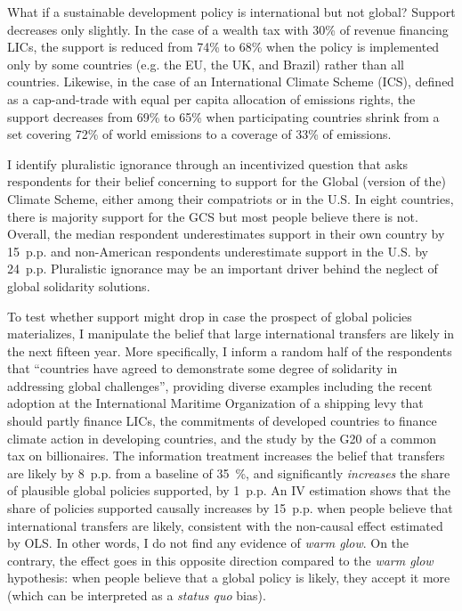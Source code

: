 \documentclass[12pt,english]{article}
\begin{document}
\begin{bibunit}
What if a sustainable development policy is international but not global? Support decreases only slightly. In the case of a wealth tax with 30\% of revenue financing LICs, the support is reduced from 74\% to 68\% when the policy is implemented only by some countries (e.g. the EU, the UK, and Brazil) rather than all countries. Likewise, in the case of an International Climate Scheme (ICS), defined as a cap-and-trade with equal per capita allocation of emissions rights, 
the support decreases from 69\% to 65\% when participating countries shrink from a set covering 72\% of world emissions to a coverage of 33\% of emissions.

I identify pluralistic ignorance through an incentivized question that asks respondents for their belief concerning to support for the Global (version of the) Climate Scheme, either among their compatriots or in the U.S. In eight countries, there is majority support for the GCS but most people believe there is not. Overall, the median respondent underestimates support in their own country by 15~p.p. and non-American respondents underestimate support in the U.S. by 24~p.p. Pluralistic ignorance may be an important driver behind the neglect of global solidarity solutions.

To test whether support might drop in case the prospect of global policies materializes, I manipulate the belief that large international transfers are likely in the next fifteen year. More specifically, I inform a random half of the respondents that ``countries have agreed to demonstrate some
degree of solidarity in addressing global challenges'', providing diverse examples including the recent adoption at the International Maritime Organization of a shipping levy that should partly finance LICs, the commitments of developed countries to finance climate action in developing countries, and the study %
by the G20 of a common tax on billionaires. The information treatment increases the belief that transfers are likely by 8~p.p. from a baseline of 35~\%, and significantly \textit{increases} the share of plausible global policies supported, by 1~p.p. An IV estimation shows that the share of policies supported causally increases by 15~p.p. when people believe that international transfers are likely, consistent with the non-causal effect estimated by OLS. In other words, I do not find any evidence of \textit{warm glow}. On the contrary, the effect goes in this opposite direction compared to the \textit{warm glow} hypothesis: when people believe that a global policy is likely, they accept it more (which can be interpreted as a \textit{status quo} bias). 


\end{bibunit}
\end{document}
